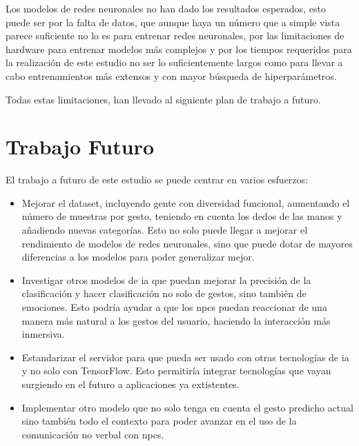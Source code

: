 Los modelos de redes neuronales no han dado los resultados esperados, esto puede ser por la falta de datos, que aunque haya un número que a simple vista parece suficiente no lo es para entrenar redes neuronales, por las limitaciones de hardware para entrenar modelos más complejos y por los tiempos requeridos para la realización de este estudio no ser lo suficientemente largos como para llevar a cabo entrenamientos más extensos y con mayor búsqueda de hiperparámetros.

Todas estas limitaciones, han llevado al siguiente plan de trabajo a futuro.


\section{Trabajo Futuro}

El trabajo a futuro de este estudio se puede centrar en varios esfuerzos:
\begin{itemize}
    \item Mejorar el dataset, incluyendo gente con diversidad funcional, aumentando el número de muestras por gesto, teniendo en cuenta los dedos de las manos y añadiendo nuevas categorías. Esto no solo puede llegar a mejorar el rendimiento de modelos de redes neuronales, sino que puede dotar de mayores diferencias a los modelos para poder generalizar mejor.
    \item Investigar otros modelos de \gls{ia} que puedan mejorar la precisión de la clasificación y hacer clasificación no solo de gestos, sino también de emociones. Esto podría ayudar a que los \glspl{npc} puedan reaccionar de una manera más natural a los gestos del usuario, haciendo la interacción más inmersiva.
    \item Estandarizar el servidor para que pueda ser usado con otras tecnologías de \gls{ia} y no solo con TensorFlow. Esto permitiría integrar tecnologías que vayan surgiendo en el futuro a aplicaciones ya extistentes.
    \item Implementar otro modelo que no solo tenga en cuenta el gesto predicho actual sino también todo el contexto para poder avanzar en el uso de la comunicación no verbal con \glspl{npc}.
\end{itemize}



